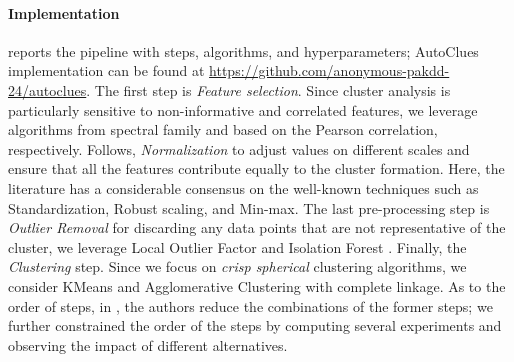 \paragraph{Implementation}  reports the pipeline with steps, algorithms, and hyperparameters; AutoClues implementation can be found at \url{https://github.com/anonymous-pakdd-24/autoclues}.
The first step is \textit{Feature selection}.
Since cluster analysis is particularly sensitive to non-informative and correlated features, we leverage algorithms from spectral family and based on the Pearson correlation, respectively. 
Follows, \textit{Normalization} to adjust values on different scales and ensure that all the features contribute equally to the cluster formation.
Here, the literature has a considerable consensus on the well-known techniques such as Standardization, Robust scaling, and Min-max.
The last pre-processing step is \textit{Outlier Removal} for discarding any data points that are not representative of the cluster, we leverage Local Outlier Factor \cite{breunig2000lof} and Isolation Forest \cite{liu2012isolation}.
Finally, the \textit{Clustering} step.
Since we focus on \textit{crisp spherical} clustering algorithms, we consider KMeans \cite{arthur2006k} and Agglomerative Clustering \cite{murtagh2017algorithms} with complete linkage.
As to the order of steps, in \cite{giovanelli2022data}, the authors reduce the combinations of the former steps; we further constrained the order of the steps by computing several experiments and observing the impact of different alternatives.

